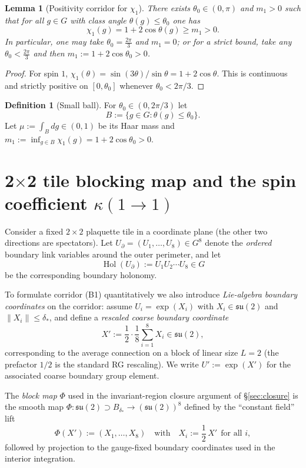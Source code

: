 \documentclass[11pt]{article}
\newtheorem{lemma}[theorem]{Lemma}
\theoremstyle{definition}
\newtheorem{definition}[theorem]{Definition}
\newcommand{\1}{\mathbf{1}}
\begin{document}
\begin{lemma}[Positivity corridor for $\chi_1$]
There exists $\theta_0\in(0,\pi)$ and $m_1>0$ such that for all $g\in G$ with class angle $\theta(g)\le \theta_0$ one has
\[\chi_1(g)=1+2\cos\theta(g)\ge m_1>0.
\]
In particular, one may take $\theta_0=\tfrac{2\pi}{3}$ and $m_1=0$; or for a strict bound, take any $\theta_0<\tfrac{2\pi}{3}$ and then $m_1:=1+2\cos\theta_0>0$.
\end{lemma}
\begin{proof}
For spin $1$, $\chi_1(\theta)=\sin(3\theta)/\sin\theta=1+2\cos\theta$. This is continuous and strictly positive on $[0,\theta_0]$ whenever $\theta_0<2\pi/3$.\end{proof}

\begin{definition}[Small ball]
For $\theta_0\in(0,2\pi/3)$ let
\[
B:=\{g\in G: \theta(g)\le \theta_0\}.
\]
Let $\mu:=\int_B dg\in(0,1)$ be its Haar mass and $m_1:=\inf_{g\in B}\chi_1(g)=1+2\cos\theta_0>0$.
\end{definition}

\section{2$\times$2 tile blocking map and the spin coefficient $\kappa(1\to 1)$}
Consider a fixed $2\times 2$ plaquette tile in a coordinate plane (the other two directions are spectators).
Let $U_{\partial}=(U_1,\dots,U_8)\in G^8$ denote the \emph{ordered} boundary link variables around the outer perimeter, and let
\[
\operatorname{Hol}(U_{\partial}) := U_1U_2\cdots U_8\in G
\]
be the corresponding boundary holonomy.

To formulate corridor (B1) quantitatively we also introduce \emph{Lie-algebra boundary coordinates} on the corridor:
assume $U_i=\exp(X_i)$ with $X_i\in\mathfrak{su}(2)$ and $\|X_i\|\le \delta_*$, and define a \emph{rescaled coarse boundary coordinate}
\begin{equation}\label{eq:coarse-boundary-coordinate}
X' := \frac{1}{2}\cdot\frac{1}{8}\sum_{i=1}^8 X_i\in\mathfrak{su}(2),
\end{equation}
corresponding to the average connection on a block of linear size $L=2$ (the prefactor $1/2$ is the standard RG rescaling).
We write $U':=\exp(X')$ for the associated coarse boundary group element.

The \emph{block map} $\Phi$ used in the invariant-region closure argument of \S\ref{sec:closure} is the smooth map
$\Phi:\mathfrak{su}(2)\supset B_{\delta_*}\to (\mathfrak{su}(2))^8$ defined by the ``constant field'' lift
\begin{equation}\label{eq:block-map-Phi}
\Phi(X') := (X_1,\dots,X_8)\quad\text{with}\quad X_i := \frac{1}{2}\,X' \ \ \text{for all }i,
\end{equation}
followed by projection to the gauge-fixed boundary coordinates used in the interior integration.
\end{document}
